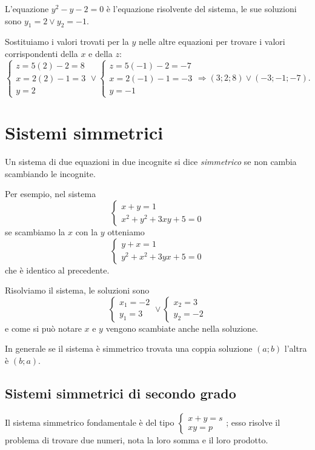\begin{exrig}
\begin{esempio}
L'equazione $y^2-y-2=0$ è l'equazione risolvente del sistema, le sue soluzioni sono $y_1=2\vee y_2=-1$.

Sostituiamo i valori trovati per la $ y $ nelle altre equazioni per trovare i valori corrispondenti della $ x $ e della $ z $: \[ \left\{\begin{array}{l}z=5(2)-2=8 \\x=2(2)-1=3 \\y=2 \end{array}\right.\vee \left\{\begin{array}{l}z=5(-1)-2=-7 \\x=2(-1)-1=-3 \\y=-1 \end{array}\right.\Rightarrow (3;2;8)\vee (-3;-1;-7). \]
\end{esempio}
\end{exrig}
\ovalbox{\risolvii \ref{ese:6.12}, \ref{ese:6.13}}

\section{Sistemi simmetrici}
Un sistema di due equazioni in due incognite si dice \emph{simmetrico} se non cambia scambiando le incognite.

Per esempio, nel sistema 
\[\left\{\begin{array}{l}{x+y=1}\\{x^2+y^2+3{xy}+5=0}\end{array}\right.\] se scambiamo la $x$ con la $y$ otteniamo 
\[\left\{\begin{array}{l}{y+x=1}\\{y^2+x^2+3{yx}+5=0}\end{array}\right.\] che è identico al precedente.

Risolviamo il sistema, le soluzioni sono 
\[\left\{\begin{array}{l}{x_1=-2}\\{y_1=3}\end{array}\right.\vee \left\{\begin{array}{l}{x_2=3}\\{y_2=-2}\end{array}\right.\] 
e come si può notare $x$ e $y$ vengono scambiate anche nella soluzione.

In generale se il sistema è simmetrico trovata una coppia soluzione $(a;b)$ l’altra è $(b;a)$.

\subsection{Sistemi simmetrici di secondo grado}
Il sistema simmetrico fondamentale è del tipo $\left\{\begin{array}{l}{x+y=s}\\{xy=p}\end{array}\right.$; esso risolve il problema di trovare due numeri, nota la loro somma e il loro prodotto.

